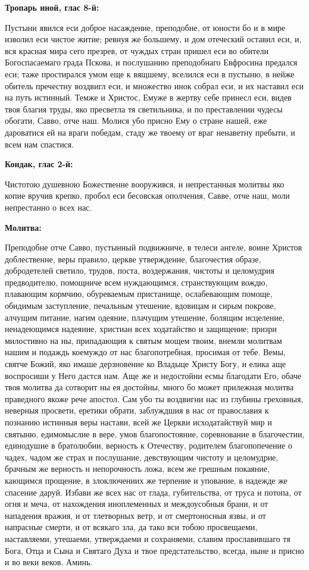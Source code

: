 \medskip


\bfseries Тропарь иной, глас 8-й:\normalfont{}


Пустыни явился еси доброе насаждение, преподобне, от юности бо и в мире изволил еси чистое житие; ревнуя же большему, и дом отеческий оставил еси, и, вся красная мира сего презрев, от чуждых стран пришел еси во обители Богоспасаемаго града Пскова, и послушанию преподобнаго Евфросина предался еси; таже простирался умом еще к вящшему, вселился еси в пустыню, в нейже обитель пречестну воздвигл еси, и множество инок собрал еси, и их наставил еси на путь истинный. Темже и Христос, Емуже в жертву себе принесл еси, видев твоя благия труды, яко пресветла тя светильника, и по преставлении чудесы обогати, Савво, отче наш. Молися убо присно Ему о стране нашей, еже дароватися ей на враги победам, стаду же твоему от враг ненаветну пребыти, и всем нам спастися.


\medskip


\bfseries Кондак, глас 2-й:\normalfont{}


Чистотою душевною Божественне вооружився, и непрестанныя молитвы яко копие вручив крепко, пробол еси бесовская ополчения, Савве, отче наш, моли непрестанно о всех нас.


\medskip


\bfseries Молитва:\normalfont{}


Преподобне отче Савво, пустынный подвижниче, в телеси ангеле, воине Христов доблественне, веры правило, церкве утверждение, благочестия образе, добродетелей светило, трудов, поста, воздержания, чистоты и целомудрия предводителю, помощниче всем нуждающимся, странствующим вождю, плавающим кормчию, обуреваемым пристанище, ослабевающим помоще, обидимым заступление, печальным утешение, вдовицам и сирым покрове, алчущим питание, нагим одеяние, плачущим утешение, болящим исцеление, ненадеющимся надеяние, христиан всех ходатайство и защищение; призри милостивно на ны, припадающия к святым мощем твоим, внемли молитвам нашим и подаждь коемуждо от нас благопотребная, просимая от тебе. Вемы, святче Божий, яко имаше дерзновение ко Владыце Христу Богу, и елика аще воспросиши у Него дастся нам. Аще же и недостойни есмы благодати Его, обаче твоя молитва да сотворит ны ея достойны, много бо может прилежная молитва праведного якоже рече апостол. Сам убо ты воздвигни нас из глубины греховныя, неверныя просвети, еретики обрати, заблуждшия в нас от православия к познанию истинныя веры настави, всей же Церкви исходатайствуй мир и святыню, едимомыслие в вере, умов благопостояние, соревнование в благочестии, единодушие в братолюбии, верность к Отечеству, родителем благопопечение о чадех, чадом же страх и послушание, девствующим чистоту и целомудрие, брачным же верность н непорочность ложа, всем же грешным покаяние, кающимся прощение, в злоключениих же терпение и упование, в надежде же спасение даруй. Избави же всех нас от глада, губительства, от труса и потопа, от огня и меча, от нахождения иноплеменных и междоусобныя брани, и от нападения вражия, и от тлетворных ветр, и от смертоносныя язвы, и от напрасные смерти, и от всякаго зла, да тако вси тобою просвещаеми, наставляеми, утешаеми, утверждаеми и сохраняеми, славим прославившаго тя Бога, Отца и Сына и Святаго Духа и твое предстательство, всегда, ныне и присно и во веки веков. Аминь.


